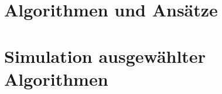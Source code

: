 
\listfiles



\cleardoublepage

\setcounter{page}{1}
\pagestyle{maincontentstyle}


\part{Algorithmen und Ansätze}






\part{Simulation ausgewählter Algorithmen}







